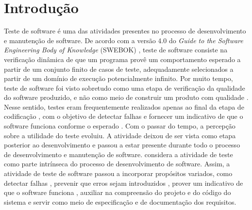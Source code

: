 \chapter{Introdução}
\label{chapter:introduction}

Teste de software é uma das atividades presentes no processo de desenvolvimento e manutenção de software. De acordo com a versão 4.0 do \textit{Guide to the Software Engineering Body of Knowledge} (SWEBOK) \cite{washizaki:2024}, teste de software consiste na verificação dinâmica de que um programa provê um comportamento esperado a partir de um conjunto finito de casos de teste, adequadamente selecionados a partir de um domínio de execução potencialmente infinito. Por muito tempo, teste de software foi visto sobretudo como uma etapa de verificação da qualidade do software produzido, e não como meio de construir um produto com qualidade \cite{murugesan:1994}. Nesse sentido, testes eram frequentemente realizados apenas ao final da etapa de codificação \cite{yang:etal:2011}, com o objetivo de detectar falhas e fornecer um indicativo de que o software funciona conforme o esperado \cite{bertolino:2007}. Com o passar do tempo, a percepção sobre a utilidade do teste evoluiu. A atividade deixou de ser vista como etapa posterior ao desenvolvimento e passou a estar presente durante todo o processo de desenvolvimento e manutenção de software.  considera a atividade de teste como parte intrínseca do processo de desenvolvimento de software. Assim, a atividade de teste de software passou a incorporar propósitos variados, como detectar falhas \cite{tiwari:etal:2013}, prevenir que erros sejam introduzidos \cite{beizer:1990}, prover um indicativo de que o software funciona \cite{bertolino:2007}, auxiliar na compreensão do projeto e do código do sistema \cite{freeman:etal:2009} e servir como meio de especificação \cite{alvestad:2007} e de documentação \cite{haugset:etal:2008} dos requisitos.

